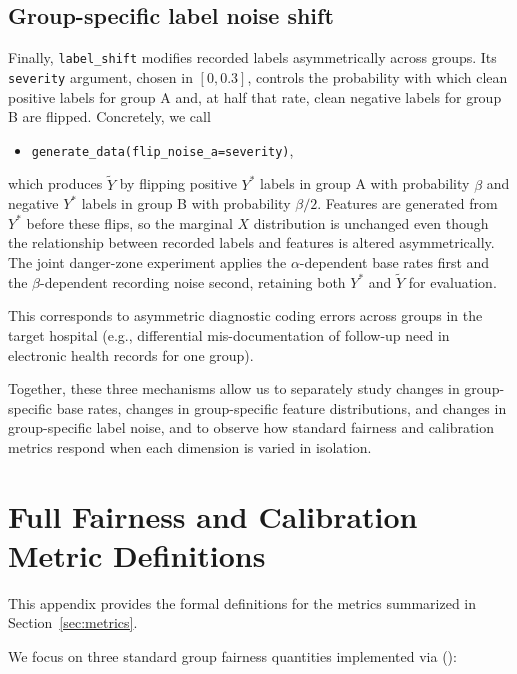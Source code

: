 \documentclass[11pt, letterpaper]{article}
\begin{document}
\subsection{Group-specific label noise shift}

Finally, \texttt{label\_shift} modifies recorded labels asymmetrically across groups. Its \texttt{severity} argument, chosen in \([0, 0.3]\), controls the probability with which clean positive labels for group A and, at half that rate, clean negative labels for group B are flipped. Concretely, we call
\begin{itemize}
    \item \texttt{generate\_data(flip\_noise\_a=severity)},
\end{itemize}
which produces $\tilde{Y}$ by flipping positive $Y^*$ labels in group A with probability \(\beta\) and negative $Y^*$ labels in group B with probability \(\beta/2\). Features are generated from $Y^*$ before these flips, so the marginal \(X\) distribution is unchanged even though the relationship between recorded labels and features is altered asymmetrically. The joint danger-zone experiment applies the $\alpha$-dependent base rates first and the $\beta$-dependent recording noise second, retaining both $Y^*$ and $\tilde{Y}$ for evaluation.

This corresponds to asymmetric diagnostic coding errors across groups in the target hospital (e.g., differential mis-documentation of follow-up need in electronic health records for one group).

Together, these three mechanisms allow us to separately study changes in group-specific base rates, changes in group-specific feature distributions, and changes in group-specific label noise, and to observe how standard fairness and calibration metrics respond when each dimension is varied in isolation.

\section{Full Fairness and Calibration Metric Definitions}
\label{app:b}

This appendix provides the formal definitions for the metrics summarized in Section~\ref{sec:metrics}.

We focus on three standard group fairness quantities implemented via
 ():
\end{document}
